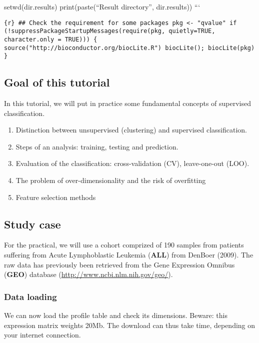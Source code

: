 setwd(dir.results) print(paste(``Result directory'', dir.results)) ```

\texttt{\{r\} \#\# Check the requirement for some packages pkg \textless{}- "qvalue" if (!suppressPackageStartupMessages(require(pkg, quietly=TRUE, character.only = TRUE))) \{   source("http://bioconductor.org/biocLite.R")   biocLite();   biocLite(pkg) \}}

\subsection{Goal of this tutorial}\label{goal-of-this-tutorial}

In this tutorial, we will put in practice some fundamental concepts of
supervised classification.

\begin{enumerate}
\def\labelenumi{\arabic{enumi}.}
\itemsep1pt\parskip0pt
\item
  Distinction between unsupervised (clustering) and supervised
  classification.
\item
  Steps of an analysis: training, testing and prediction.
\item
  Evaluation of the classification: cross-validation ({CV}),
  leave-one-out ({LOO}).
\item
  The problem of over-dimensionality and the risk of overfitting
\item
  Feature selection methods
\end{enumerate}

\subsection{Study case}\label{study-case}

For the practical, we will use a cohort comprized of 190 samples from
patients suffering from Acute Lymphoblastic Leukemia (\textbf{ALL}) from
DenBoer (2009). The raw data has previously been retrieved from the Gene
Expression Omnibus (\textbf{GEO}) database
(\url{http://www.ncbi.nlm.nih.gov/geo/}).

\subsubsection{Data loading}\label{data-loading}

We can now load the profile table and check its dimensions. Beware: this
expression matrix weights 20Mb. The download can thus take time,
depending on your internet connection.


